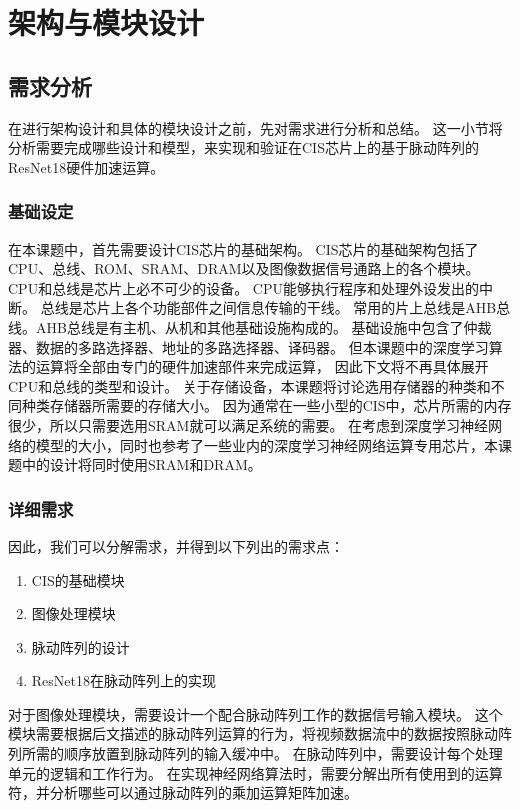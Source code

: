 
\chapter{架构与模块设计}

\section{需求分析}
在进行架构设计和具体的模块设计之前，先对需求进行分析和总结。
这一小节将分析需要完成哪些设计和模型，来实现和验证在CIS芯片上的基于脉动阵列的ResNet18硬件加速运算。


\subsection{基础设定}

在本课题中，首先需要设计CIS芯片的基础架构。
CIS芯片的基础架构包括了CPU、总线、ROM、SRAM、DRAM以及图像数据信号通路上的各个模块。
CPU和总线是芯片上必不可少的设备。
CPU能够执行程序和处理外设发出的中断。
总线是芯片上各个功能部件之间信息传输的干线。
常用的片上总线是AHB总线。AHB总线是有主机、从机和其他基础设施构成的。
基础设施中包含了仲裁器、数据的多路选择器、地址的多路选择器、译码器。
但本课题中的深度学习算法的运算将全部由专门的硬件加速部件来完成运算，
因此下文将不再具体展开CPU和总线的类型和设计。
关于存储设备，本课题将讨论选用存储器的种类和不同种类存储器所需要的存储大小。
因为通常在一些小型的CIS中，芯片所需的内存很少，所以只需要选用SRAM就可以满足系统的需要。
在考虑到深度学习神经网络的模型的大小，同时也参考了一些业内的深度学习神经网络运算专用芯片，本课题中的设计将同时使用SRAM和DRAM。


\subsection{详细需求}

因此，我们可以分解需求，并得到以下列出的需求点：
\begin{enumerate}
    \item CIS的基础模块
    \item 图像处理模块
    \item 脉动阵列的设计
    \item ResNet18在脉动阵列上的实现
\end{enumerate}    

对于图像处理模块，需要设计一个配合脉动阵列工作的数据信号输入模块。
这个模块需要根据后文描述的脉动阵列运算的行为，将视频数据流中的数据按照脉动阵列所需的顺序放置到脉动阵列的输入缓冲中。
在脉动阵列中，需要设计每个处理单元的逻辑和工作行为。
在实现神经网络算法时，需要分解出所有使用到的运算符，并分析哪些可以通过脉动阵列的乘加运算矩阵加速。


